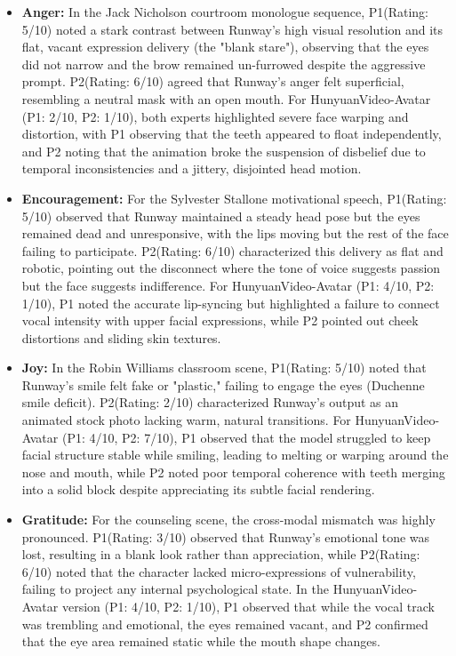 \documentclass[pdflatex,sn-mathphys-num]{sn-jnl}
\newcommand{\emAnger}{Anger\xspace}
\newcommand{\emEncouragement}{Encouragement\xspace}
\newcommand{\emJoy}{Joy\xspace}
\newcommand{\emGratitude}{Gratitude\xspace}
\newcommand{\Pone}{\colorbox{gray!15}{P1}\xspace}
\newcommand{\Ptwo}{\colorbox{gray!30}{P2}\xspace}
\theoremstyle{thmstyleone}
\theoremstyle{thmstyletwo}
\theoremstyle{thmstylethree}
\begin{document}
\begin{itemize}
    \item \textbf{\emAnger:} In the Jack Nicholson courtroom monologue sequence, \Pone (Rating: 5/10) noted a stark contrast between Runway's high visual resolution and its flat, vacant expression delivery (the "blank stare"), observing that the eyes did not narrow and the brow remained un-furrowed despite the aggressive prompt. \Ptwo (Rating: 6/10) agreed that Runway's anger felt superficial, resembling a neutral mask with an open mouth. For HunyuanVideo-Avatar (\Pone: 2/10, \Ptwo: 1/10), both experts highlighted severe face warping and distortion, with \Pone observing that the teeth appeared to float independently, and \Ptwo noting that the animation broke the suspension of disbelief due to temporal inconsistencies and a jittery, disjointed head motion.
    \item \textbf{\emEncouragement:} For the Sylvester Stallone motivational speech, \Pone (Rating: 5/10) observed that Runway maintained a steady head pose but the eyes remained dead and unresponsive, with the lips moving but the rest of the face failing to participate. \Ptwo (Rating: 6/10) characterized this delivery as flat and robotic, pointing out the disconnect where the tone of voice suggests passion but the face suggests indifference. For HunyuanVideo-Avatar (\Pone: 4/10, \Ptwo: 1/10), \Pone noted the accurate lip-syncing but highlighted a failure to connect vocal intensity with upper facial expressions, while \Ptwo pointed out cheek distortions and sliding skin textures.
    \item \textbf{\emJoy:} In the Robin Williams classroom scene, \Pone (Rating: 5/10) noted that Runway's smile felt fake or "plastic," failing to engage the eyes (Duchenne smile deficit). \Ptwo (Rating: 2/10) characterized Runway's output as an animated stock photo lacking warm, natural transitions. For HunyuanVideo-Avatar (\Pone: 4/10, \Ptwo: 7/10), \Pone observed that the model struggled to keep facial structure stable while smiling, leading to melting or warping around the nose and mouth, while \Ptwo noted poor temporal coherence with teeth merging into a solid block despite appreciating its subtle facial rendering.
    \item \textbf{\emGratitude:} For the counseling scene, the cross-modal mismatch was highly pronounced. \Pone (Rating: 3/10) observed that Runway's emotional tone was lost, resulting in a blank look rather than appreciation, while \Ptwo (Rating: 6/10) noted that the character lacked micro-expressions of vulnerability, failing to project any internal psychological state. In the HunyuanVideo-Avatar version (\Pone: 4/10, \Ptwo: 1/10), \Pone observed that while the vocal track was trembling and emotional, the eyes remained vacant, and \Ptwo confirmed that the eye area remained static while the mouth shape changes.
\end{itemize}
\end{document}
